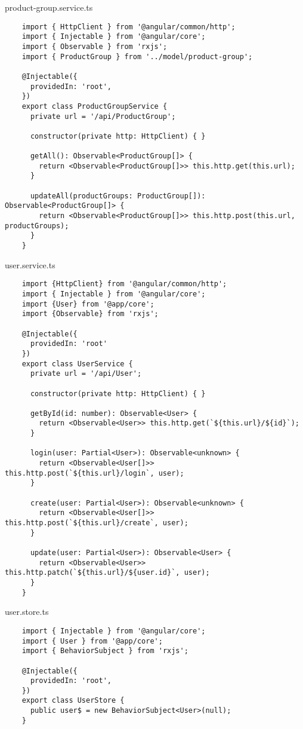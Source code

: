 product-group.service.ts
\begin{lstlisting}
    import { HttpClient } from '@angular/common/http';
    import { Injectable } from '@angular/core';
    import { Observable } from 'rxjs';
    import { ProductGroup } from '../model/product-group';
    
    @Injectable({
      providedIn: 'root',
    })
    export class ProductGroupService {
      private url = '/api/ProductGroup';
    
      constructor(private http: HttpClient) { }
    
      getAll(): Observable<ProductGroup[]> {
        return <Observable<ProductGroup[]>> this.http.get(this.url);
      }
    
      updateAll(productGroups: ProductGroup[]): Observable<ProductGroup[]> {
        return <Observable<ProductGroup[]>> this.http.post(this.url, productGroups);
      }
    }
\end{lstlisting}

user.service.ts
\begin{lstlisting}
    import {HttpClient} from '@angular/common/http';
    import { Injectable } from '@angular/core';
    import {User} from '@app/core';
    import {Observable} from 'rxjs';
    
    @Injectable({
      providedIn: 'root'
    })
    export class UserService {
      private url = '/api/User';
    
      constructor(private http: HttpClient) { }
    
      getById(id: number): Observable<User> {
        return <Observable<User>> this.http.get(`${this.url}/${id}`);
      }
    
      login(user: Partial<User>): Observable<unknown> {
        return <Observable<User[]>> this.http.post(`${this.url}/login`, user);
      }
    
      create(user: Partial<User>): Observable<unknown> {
        return <Observable<User[]>> this.http.post(`${this.url}/create`, user);
      }
    
      update(user: Partial<User>): Observable<User> {
        return <Observable<User>> this.http.patch(`${this.url}/${user.id}`, user);
      }
    }    
\end{lstlisting}

user.store.ts
\begin{lstlisting}
    import { Injectable } from '@angular/core';
    import { User } from '@app/core';
    import { BehaviorSubject } from 'rxjs';
    
    @Injectable({
      providedIn: 'root',
    })
    export class UserStore {
      public user$ = new BehaviorSubject<User>(null);
    }    
\end{lstlisting}


